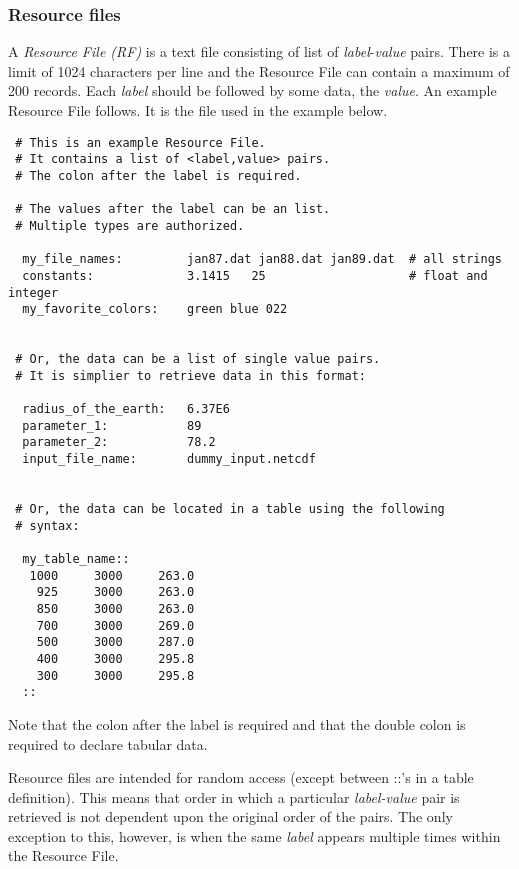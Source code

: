 
 \subsubsection{Resource files}

   A {\em Resource File (RF)} is a text file consisting of list of 
   {\em label}-{\em value} pairs. There is a limit of 1024 characters 
   per line and the Resource File can contain a maximum of 200 records. 
   Each {\em label} should be followed by some data, the {\em value}. 
   An example Resource File follows.  It is the file used in the example 
   below. 

 \begin{verbatim}
 # This is an example Resource File.  
 # It contains a list of <label,value> pairs.
 # The colon after the label is required. 

 # The values after the label can be an list.
 # Multiple types are authorized.
  
  my_file_names:         jan87.dat jan88.dat jan89.dat  # all strings
  constants:             3.1415   25                    # float and integer
  my_favorite_colors:    green blue 022               


 # Or, the data can be a list of single value pairs. 
 # It is simplier to retrieve data in this format:

  radius_of_the_earth:   6.37E6         
  parameter_1:           89
  parameter_2:           78.2
  input_file_name:       dummy_input.netcdf 


 # Or, the data can be located in a table using the following
 # syntax:

  my_table_name::
   1000     3000     263.0
    925     3000     263.0
    850     3000     263.0
    700     3000     269.0
    500     3000     287.0
    400     3000     295.8
    300     3000     295.8
  ::
 \end{verbatim}

 Note that the colon after the label is required and that the double colon is required
 to declare tabular data. 

 Resource files are intended for random access (except between ::'s in a 
 table definition). This means that order in which a particular 
 {\em label-value} pair is retrieved is not dependent upon the original order 
 of the pairs. The only exception to this, however, is when the same {\em label} appears 
 multiple times within the Resource File.





